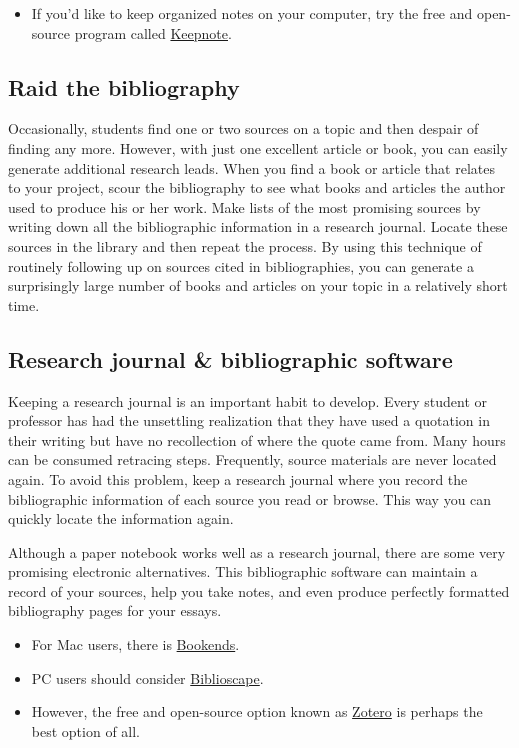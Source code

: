 \begin{itemize}
\item If you'd like to keep organized notes on your computer, try the free and open-source
program called \href{http://rasm.ods.org/keepnote}{Keepnote}.
\end{itemize}

\subsection{Raid the bibliography}

Occasionally, students find one or two sources on a topic and then despair of
finding any more. However, with just one excellent article or book, you can
easily generate additional research leads. When you find a book or article that
relates to your project, scour the bibliography to see what books and articles
the author used to produce his or her work. Make lists of the most promising
sources by writing down all the bibliographic information in a research
journal. Locate these sources in the library and then repeat the process. By
using this technique of routinely following up on sources cited in
bibliographies, you can generate a surprisingly large number of books and
articles on your topic in a relatively short time.

\subsection{Research journal \& bibliographic software}

Keeping a research journal is an important habit to develop. Every student or
professor has had the unsettling realization that they have used a quotation in
their writing but have no recollection of where the quote came from. Many hours
can be consumed retracing steps. Frequently, source materials are never located
again. To avoid this problem, keep a research journal where you record the
bibliographic information of each source you read or browse. This way you can
quickly locate the information again.

Although a paper notebook works well as a research journal, there are some very
promising electronic alternatives. This bibliographic software can maintain a
record of your sources, help you take notes, and even produce perfectly
formatted bibliography pages for your essays.  \begin{itemize}\item For Mac
users, there is \href{http://www.sonnysoftware.com/}{Bookends}.  \item PC users
should consider \href{http://www.biblioscape.com}{Biblioscape}.  \item However,
the free and open-source option known as \href{http://zotero.org}{Zotero} is
perhaps the best option of all. \end{itemize}
